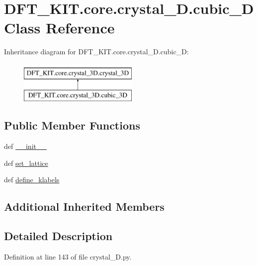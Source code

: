 \hypertarget{class_d_f_t___k_i_t_1_1core_1_1crystal__3_d_1_1cubic__3_d}{\section{D\+F\+T\+\_\+\+K\+I\+T.\+core.\+crystal\+\_\+D.\+cubic\+\_\+D Class Reference}
\label{class_d_f_t___k_i_t_1_1core_1_1crystal__3_d_1_1cubic__3_d}
}
Inheritance diagram for D\+F\+T\+\_\+\+K\+I\+T.\+core.\+crystal\+\_\+D.\+cubic\+\_\+D\+:\begin{figure}[H]
\begin{center}
\leavevmode
\includegraphics[height=2.000000cm]{class_d_f_t___k_i_t_1_1core_1_1crystal__3_d_1_1cubic__3_d}
\end{center}
\end{figure}
\subsection*{Public Member Functions}
\begin{DoxyCompactItemize}
\item 
def \hyperlink{class_d_f_t___k_i_t_1_1core_1_1crystal__3_d_1_1cubic__3_d_afb64ae6d89fa19d00038646c7c02956d}{\+\_\+\+\_\+init\+\_\+\+\_\+}
\item 
def \hyperlink{class_d_f_t___k_i_t_1_1core_1_1crystal__3_d_1_1cubic__3_d_ac17732ec3417c8748fc32439f101987a}{set\+\_\+lattice}
\item 
def \hyperlink{class_d_f_t___k_i_t_1_1core_1_1crystal__3_d_1_1cubic__3_d_a6f120c6e684c7dcdbf8f9e55df605e1b}{define\+\_\+klabels}
\end{DoxyCompactItemize}
\subsection*{Additional Inherited Members}


\subsection{Detailed Description}


Definition at line 143 of file crystal\+\_\+D.\+py.



